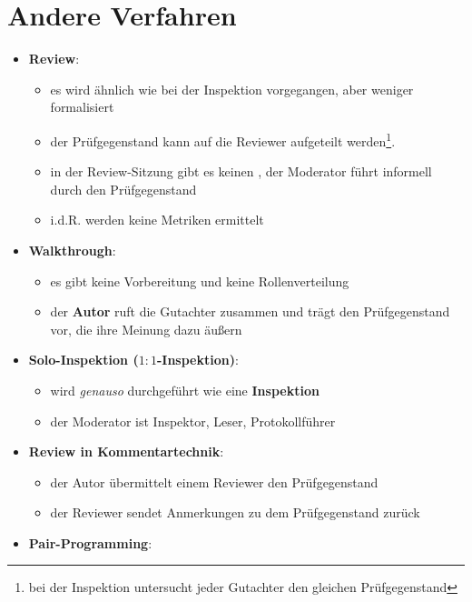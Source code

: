 \section{Andere Verfahren}\label{sec:andere-verfahren}

\begin{itemize}
    \item \textbf{Review}:
    \begin{itemize}
        \item es wird ähnlich wie bei der Inspektion vorgegangen, aber weniger formalisiert
        \item der Prüfgegenstand kann auf die Reviewer aufgeteilt werden\footnote{
            bei der Inspektion untersucht jeder Gutachter den gleichen Prüfgegenstand
        }.\\
        \item in der Review-Sitzung gibt es keinen , der Moderator führt informell durch den Prüfgegenstand
        \item i.d.R. werden keine Metriken ermittelt
    \end{itemize}
    \item \textbf{Walkthrough}:
    \begin{itemize}
        \item es gibt keine Vorbereitung und keine Rollenverteilung
        \item der \textbf{Autor} ruft die Gutachter zusammen und trägt den Prüfgegenstand vor, die ihre Meinung dazu äußern
    \end{itemize}
    \item \textbf{Solo-Inspektion ($1:1$-Inspektion)}:
    \begin{itemize}
        \item wird \textit{genauso} durchgeführt wie eine \textbf{Inspektion}
        \item der Moderator ist Inspektor, Leser, Protokollführer
    \end{itemize}
    \item \textbf{Review in Kommentartechnik}:
    \begin{itemize}
        \item der Autor übermittelt einem Reviewer den Prüfgegenstand
        \item der Reviewer sendet Anmerkungen zu dem Prüfgegenstand zurück
    \end{itemize}
    \item \textbf{Pair-Programming}:
    \begin{itemize}

\end{itemize}
\end{itemize}
